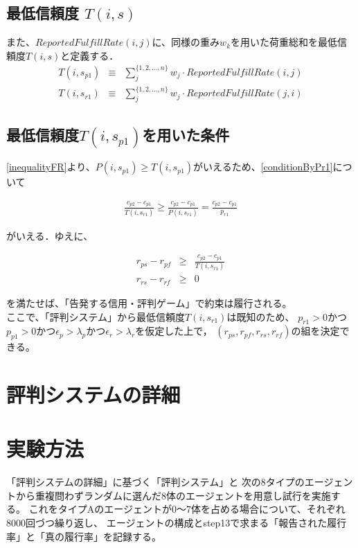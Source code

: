 \subsection{最低信頼度 $ T(i, s) $}
また、$ ReportedFulfillRate(i, j)$に、同様の重み$ w_k $を用いた荷重総和を最低信頼度$ T(i, s) $と定義する． \\

\begin{eqnarray}
  T(i, s_{p1}) &\equiv& \sum^{\{1,2,..., n\}}_{j} w_j \cdot ReportedFulfillRate(i, j) \label{conditionT_i} \\
  T(i, s_{r1}) &\equiv& \sum^{\{1,2,..., n\}}_{j} w_j \cdot ReportedFulfillRate(j, i)
\end{eqnarray}

\subsection{最低信頼度$T(i, s_{p1})$を用いた条件}
\label{conditionByTrustScore}
\eqref{inequalityFR}より、$ P(i, s_{p1}) \geq T(i, s_{p1}) $がいえるため、\eqref{conditionByPr1}について

\begin{eqnarray}
  \frac{c_{p2} - c_{p1}}{T(i, s_{r1})} \geq \frac{c_{p2} - c_{p1}}{P(i, s_{r1})} = \frac{c_{p2} - c_{p1}}{p_{r1}} \nonumber
\end{eqnarray}

がいえる．ゆえに、

\begin{eqnarray}
  r_{ps} - r_{pf} &\geq& \frac{c_{p2} - c_{p1}}{T(i, s_{r1})} \label{condition6-1} \\
  r_{rs} - r_{rf} &\geq& 0 \label{condition6-2}
\end{eqnarray}

を満たせば、「告発する信用・評判ゲーム」で約束は履行される。\\

ここで、「評判システム」から最低信頼度$T(i, s_{r1})$は既知のため、
$p_{r1} > 0$かつ $p_{p1} > 0$かつ$ \epsilon_p > \lambda_p $かつ$ \epsilon_r > \lambda_r $を仮定した上で，
$ (r_{ps}, r_{pf}, r_{rs}, r_{rf}) $の組を決定できる。

\section{評判システムの詳細}


\section{実験方法}
「評判システムの詳細」に基づく「評判システム」と
次の8タイプのエージェントから重複問わずランダムに選んだ8体のエージェントを用意し試行を実施する。
これをタイプAのエージェントが0〜7体を占める場合について、それぞれ8000回づつ繰り返し、
エージェントの構成とstep13で求まる「報告された履行率」と「真の履行率」を記録する。

